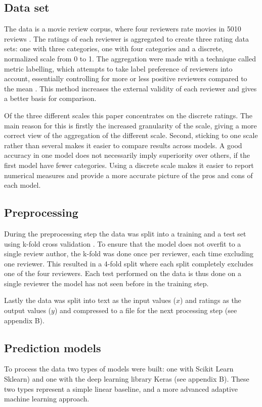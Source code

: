 \documentclass[a4paper]{article}
\begin{document}
\subsection{Data set}
\label{sec:dataset}
The data is a movie review corpus, where four reviewers rate movies in 5010
reviews \citep{PangLee2005}. The ratings of each reviewer is aggregated
to create three rating data sets: one with three categories,
one with four categories and a discrete, normalized scale from 0 to 1. The aggregation
were made with a technique called metric labelling, which attempts to take
label preference of reviewers into account, essentially controlling for more
or less positive reviewers compared to the mean \citep{PangLee2005}. This method
increases the external validity of each reviewer and gives a better basis
for comparison.

Of the three different scales this paper concentrates on the discrete ratings.
The main reason for this is firstly the increased granularity of the scale, giving a
more correct view of the aggregation of the different scale. Second, sticking
to one scale rather than several makes it easier to compare results across
models. A good accuracy in one model does not necessarily imply superiority
over others, if the first model have fewer categories. Using a discrete scale
makes it easier to report numerical measures and provide a more accurate
picture of the pros and cons of each model.

\subsection{Preprocessing}
During the preprocessing step the data was split into a training and a test
set using k-fold cross validation \citep{Russell2009}. To ensure that the
model does not overfit to a single review author, the k-fold was done once
per reviewer, each time excluding one reviewer. This resulted in a 4-fold split
where each split completely excludes one of the four reviewers. Each test
performed on the data is thus done on a single reviewer the model has not
seen before in the training step.

Lastly the data was split into text as the input values ($x$) and ratings
as the output values ($y$) and compressed to a file for the next processing
step (see appendix B).

\subsection{Prediction models}
To process the data two types of models were built: one with Scikit Learn
Sklearn) and one with the deep learning library Keras (see appendix B).
These two types represent a simple linear baseline, and a more advanced
adaptive machine learning approach.
\end{document}
